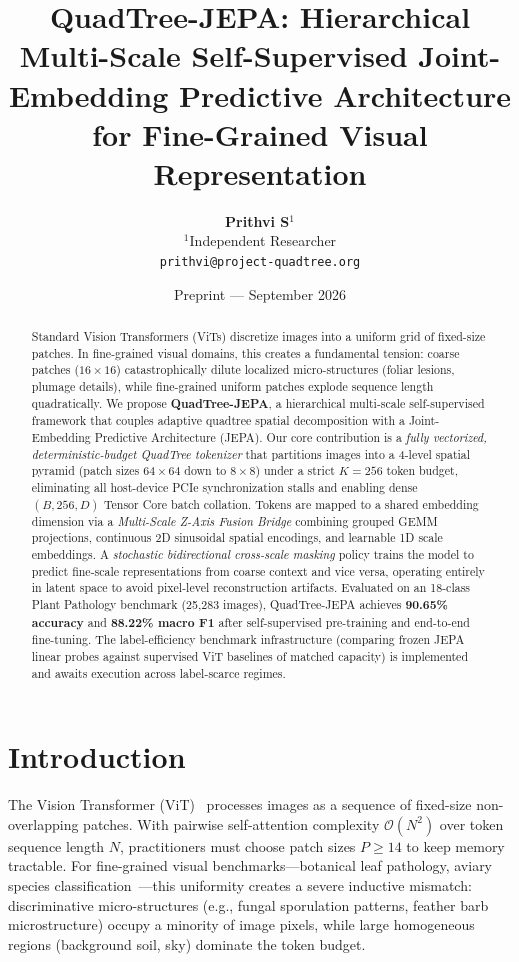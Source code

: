 \documentclass[10pt,twocolumn,letterpaper]{article}
\title{\textbf{QuadTree-JEPA: Hierarchical Multi-Scale Self-Supervised Joint-Embedding Predictive Architecture for Fine-Grained Visual Representation}}
\author{
  \textbf{Prithvi S}$^{1}$ \\
  $^{1}$Independent Researcher \\
  \texttt{prithvi@project-quadtree.org}
}
\date{Preprint — September 2026}
\begin{document}
\maketitle

\begin{abstract}
Standard Vision Transformers (ViTs) discretize images into a uniform grid of fixed-size patches. In fine-grained visual domains, this creates a fundamental tension: coarse patches ($16\!\times\!16$) catastrophically dilute localized micro-structures (foliar lesions, plumage details), while fine-grained uniform patches explode sequence length quadratically. We propose \textbf{QuadTree-JEPA}, a hierarchical multi-scale self-supervised framework that couples adaptive quadtree spatial decomposition with a Joint-Embedding Predictive Architecture (JEPA). Our core contribution is a \textit{fully vectorized, deterministic-budget QuadTree tokenizer} that partitions images into a 4-level spatial pyramid (patch sizes $64\!\times\!64$ down to $8\!\times\!8$) under a strict $K\!=\!256$ token budget, eliminating all host-device PCIe synchronization stalls and enabling dense $(B, 256, D)$ Tensor Core batch collation. Tokens are mapped to a shared embedding dimension via a \textit{Multi-Scale Z-Axis Fusion Bridge} combining grouped GEMM projections, continuous 2D sinusoidal spatial encodings, and learnable 1D scale embeddings. A \textit{stochastic bidirectional cross-scale masking} policy trains the model to predict fine-scale representations from coarse context and vice versa, operating entirely in latent space to avoid pixel-level reconstruction artifacts. Evaluated on an 18-class Plant Pathology benchmark (25,283 images), QuadTree-JEPA achieves \textbf{90.65\% accuracy} and \textbf{88.22\% macro F1} after self-supervised pre-training and end-to-end fine-tuning. The label-efficiency benchmark infrastructure (comparing frozen JEPA linear probes against supervised ViT baselines of matched capacity) is implemented and awaits execution across label-scarce regimes.
\end{abstract}

\section{Introduction}
\label{sec:intro}

The Vision Transformer (ViT)~\cite{dosovitskiy2020image} processes images as a sequence of fixed-size non-overlapping patches. With pairwise self-attention complexity $\mathcal{O}(N^2)$ over token sequence length $N$, practitioners must choose patch sizes $P \ge 14$ to keep memory tractable. For fine-grained visual benchmarks—botanical leaf pathology, aviary species classification~\cite{wah2011caltech}—this uniformity creates a severe inductive mismatch: discriminative micro-structures (e.g., fungal sporulation patterns, feather barb microstructure) occupy a minority of image pixels, while large homogeneous regions (background soil, sky) dominate the token budget.
\end{document}
